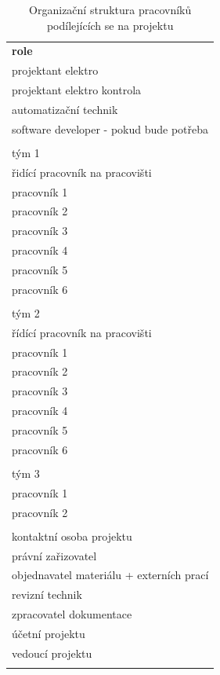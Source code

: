 \documentclass[a4paper, twoside, 11pt]{article}
\begin{document}
		\begin{table}[H]
		
			\begin{tabular}{ !{\vrule width 2pt} l !{\vrule width 2pt} }
				\textbf{role} \\ 
				projektant elektro \\ \hline
				projektant elektro kontrola \\ \hline
				automatizační technik \\ \hline
				software developer - pokud bude potřeba \\ \hline
				  \\ \hline
				tým 1 \\ \hline
				řidící pracovník na pracovišti \\ \hline
				pracovník 1 \\ \hline
				pracovník 2 \\ \hline
				pracovník 3 \\ \hline
				pracovník 4 \\ \hline
				pracovník 5 \\ \hline
				pracovník 6 \\ \hline
				  \\ \hline
				tým 2 \\ \hline
				řídící pracovník na pracovišti \\ \hline
				pracovník 1 \\ \hline
				pracovník 2 \\ \hline
				pracovník 3 \\ \hline
				pracovník 4 \\ \hline
				pracovník 5 \\ \hline
				pracovník 6 \\ \hline
				  \\ \hline
				tým 3 \\ \hline
				pracovník 1 \\ \hline
				pracovník 2 \\ \hline
				  \\ \hline
				kontaktní osoba projektu \\ \hline
				právní zařizovatel \\ \hline
				objednavatel materiálu + externích prací \\ \hline
				revizní technik \\ \hline
				zpracovatel dokumentace \\ \hline
				účetní projektu \\ \hline
				vedoucí projektu\\ 
			\end{tabular}
		\caption{Organizační struktura pracovníků podílejících se na projektu}
		\end{table}
		
\end{document}

